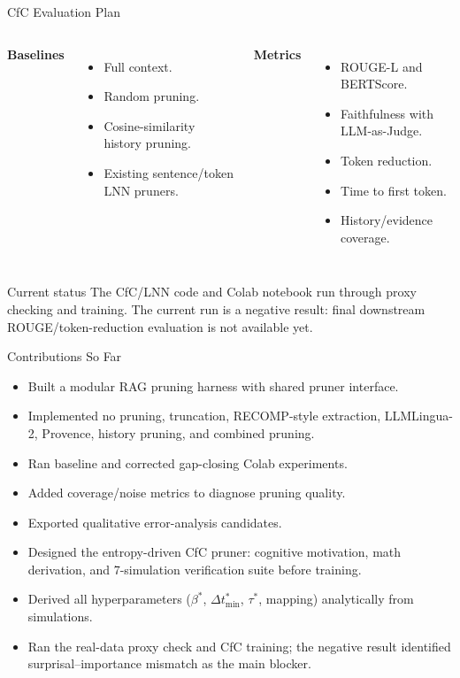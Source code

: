 \documentclass[aspectratio=169,11pt]{beamer}
\begin{document}
\begin{frame}{CfC Evaluation Plan}
  \begin{columns}[T,onlytextwidth]
    \textbf{Baselines}
    \begin{itemize}
      \item Full context.
      \item Random pruning.
      \item Cosine-similarity history pruning.
      \item Existing sentence/token LNN pruners.
    \end{itemize}

    \textbf{Metrics}
    \begin{itemize}
      \item ROUGE-L and BERTScore.
      \item Faithfulness with LLM-as-Judge.
      \item Token reduction.
      \item Time to first token.
      \item History/evidence coverage.
    \end{itemize}
  \end{columns}

  \vspace{0.8em}
  \begin{block}{Current status}
    The CfC/LNN code and Colab notebook run through proxy checking and training. The current run is a negative result: final downstream ROUGE/token-reduction evaluation is not available yet.
  \end{block}
\end{frame}

\begin{frame}{Contributions So Far}
  \begin{itemize}
    \item Built a modular RAG pruning harness with shared pruner interface.
    \item Implemented no pruning, truncation, RECOMP-style extraction, LLMLingua-2, Provence, history pruning, and combined pruning.
    \item Ran baseline and corrected gap-closing Colab experiments.
    \item Added coverage/noise metrics to diagnose pruning quality.
    \item Exported qualitative error-analysis candidates.
    \item Designed the entropy-driven CfC pruner: cognitive motivation, math derivation, and 7-simulation verification suite before training.
    \item Derived all hyperparameters ($\beta^*$, $\Delta t_{\min}^*$, $\tau^*$, mapping) analytically from simulations.
    \item Ran the real-data proxy check and CfC training; the negative result identified surprisal--importance mismatch as the main blocker.
  \end{itemize}
\end{frame}
\end{document}
